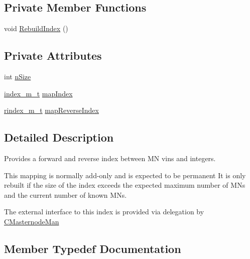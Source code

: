 \subsection*{Private Member Functions}
\begin{DoxyCompactItemize}
\item 
void \mbox{\hyperlink{class_c_masternode_index_a09611499b61d6c8be249e66df0ac1390}{Rebuild\+Index}} ()
\end{DoxyCompactItemize}
\subsection*{Private Attributes}
\begin{DoxyCompactItemize}
\item 
int \mbox{\hyperlink{class_c_masternode_index_a4df94f8851340cea142139c8490e9a1e}{n\+Size}}
\item 
\mbox{\hyperlink{class_c_masternode_index_a78c666dcc663fceff46cd86f4eb1870c}{index\+\_\+m\+\_\+t}} \mbox{\hyperlink{class_c_masternode_index_a3c1da93ff0beea2a21feac2d59bca694}{map\+Index}}
\item 
\mbox{\hyperlink{class_c_masternode_index_ad04aa24155d452c5c222562c0f3c3e21}{rindex\+\_\+m\+\_\+t}} \mbox{\hyperlink{class_c_masternode_index_af395a77efe7661aed5460ea1d478c6fd}{map\+Reverse\+Index}}
\end{DoxyCompactItemize}


\subsection{Detailed Description}
Provides a forward and reverse index between MN vin\textquotesingle{}s and integers.

This mapping is normally add-\/only and is expected to be permanent It is only rebuilt if the size of the index exceeds the expected maximum number of MN\textquotesingle{}s and the current number of known MN\textquotesingle{}s.

The external interface to this index is provided via delegation by \mbox{\hyperlink{class_c_masternode_man}{C\+Masternode\+Man}} 

\subsection{Member Typedef Documentation}
\mbox{\label{class_c_masternode_index_a012060326cfe73f675a791131b6fd91a}} 
